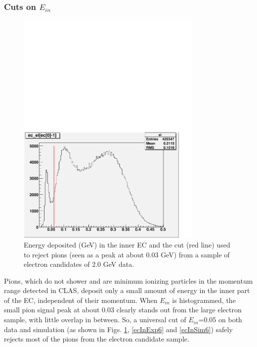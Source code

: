 \subsubsection{Cuts on $E_{in}$}
\begin{figure}[h] %
\centering
\leavevmode \includegraphics[width=0.8\textwidth]{figuresEG4/FigCuts/ec_eiCutFrmRtPrmtClasEb2.pdf}  %
\caption[EC inner energy cut (2.0 GeV)]{Energy deposited (GeV) in the inner EC and the cut (red line) used to reject pions (seen as a peak at about 0.03 GeV) from a sample of electron candidates of 2.0 GeV data.}
\label{ecInExp1}
\end{figure}

Pions, which do not shower and are minimum ionizing particles in the momentum range detected in CLAS, deposit only a small amount of energy in the inner part of the EC, %
independent of their momentum. When $E_{in}$ is histogrammed, the small pion signal peak at about 0.03 clearly stands out from the large electron sample, with little overlap in between. So, a universal cut of $E_{in}$=0.05 on both data and simulation (as shown in Figs. \ref{ecInExp1}, \ref{ecInExp6} and \ref{ecInSim6}) safely rejects most of the pions from the electron candidate sample. 


